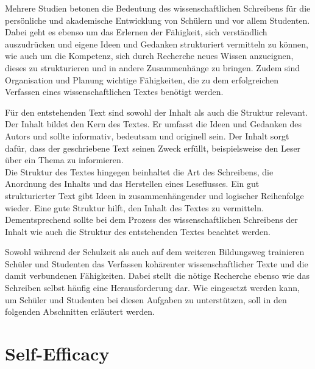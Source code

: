 \documentclass[../main.tex]{subfiles}
\begin{document}
Mehrere Studien betonen die Bedeutung des wissenschaftlichen Schreibens für die persönliche und akademische Entwicklung 
von Schülern und vor allem Studenten\cite{influencingUsingAi,ZukunftWissenschaftlichesPublizieren}. Dabei geht es ebenso um das Erlernen der Fähigkeit, sich verständlich auszudrücken und 
eigene Ideen und Gedanken strukturiert vermitteln zu können, wie auch um die Kompetenz, sich durch Recherche neues Wissen 
anzueignen, dieses zu strukturieren und in andere Zusammenhänge zu bringen. Zudem sind Organisation und Planung 
wichtige Fähigkeiten, die zu dem erfolgreichen Verfassen eines wissenschaftlichen Textes benötigt werden.\cite{SelfEfficacyBeliefs} 

Für den entstehenden Text sind sowohl der Inhalt als auch die Struktur relevant. Der Inhalt bildet den Kern des Textes. Er umfasst die Ideen und Gedanken des Autors und sollte 
informativ, bedeutsam und originell sein. Der Inhalt sorgt dafür, dass der geschriebene Text seinen Zweck erfüllt, beispielsweise 
den Leser über ein Thema zu informieren. \\
Die Struktur des Textes hingegen beinhaltet die Art des Schreibens, die Anordnung des Inhalts und das Herstellen eines Leseflusses. 
Ein gut strukturierter Text gibt Ideen in zusammenhängender und logischer Reihenfolge wieder. Eine gute Struktur hilft, den Inhalt des
Textes zu vermitteln. Dementsprechend sollte bei dem Prozess des wissenschaftlichen Schreibens der Inhalt wie auch die Struktur des entstehenden 
Textes beachtet werden.\cite{teachers}

Sowohl während der Schulzeit als auch auf dem weiteren Bildungsweg trainieren Schüler und Studenten das Verfassen kohärenter 
wissenschaftlicher Texte und die damit verbundenen Fähigkeiten. Dabei stellt die nötige Recherche ebenso wie das Schreiben selbst
häufig eine Herausforderung dar. Wie  eingesetzt werden kann, um Schüler und Studenten bei diesen Aufgaben zu 
unterstützen, soll in den folgenden Abschnitten erläutert werden. 

\section{Self-Efficacy}
\label{sec:efficacy}
\end{document}
